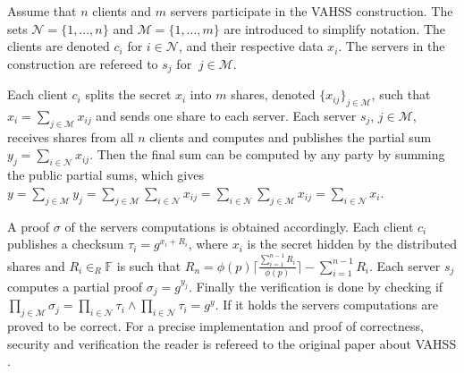 Assume that $n$ clients and $m$ servers participate in the VAHSS construction. The sets $\mathcal{N}=\{1,...,n\}$ and $\mathcal{M} = \{1,...,m\}$ are introduced to simplify notation. The clients are denoted $c_i$ for $i\in\mathcal{N}$, and their respective data $x_i$.  The servers in the construction are refereed to $s_j$ for $\:j\in\mathcal{M}$. 

Each client $c_i$ splits the secret $x_i$ into $m$ shares, denoted $\{x_{ij}\}_{j\in\mathcal{M}}$, such that $x_i=\sum_{j\in\mathcal{M}}x_{ij}$ and sends one share to each server. Each server $s_j$,  $j\in\mathcal{M}$, receives shares from all $n$ clients and computes and publishes the partial sum $y_j = \sum_{i\in\mathcal{N}} x_{ij} $. Then the final sum can be computed by any party by summing the public partial sums, which gives $y = \sum_{j\in\mathcal{M}} y_j = \sum_{j\in\mathcal{M}} \sum_{i\in\mathcal{N}} x_{ij} = \sum_{i\in\mathcal{N}} \sum_{j\in\mathcal{M}} x_{ij} =   \sum_{i\in\mathcal{N}}x_i$.


A proof $\sigma$ of the servers computations is obtained accordingly.  Each client $c_i$ publishes a checksum $\tau_i= g^{x_i+R_i}$, where $x_i$ is the secret hidden by the distributed shares and $R_i\in_R\mathds{F}$ is such that $R_n=\phi(p) \lceil \frac{\sum_{i=1}^{n-1}R_i}{\phi(p)}\rceil - \sum_{i=1}^{n-1}R_i $. Each server $s_j$ computes a partial proof $\sigma_j = g^{y_j}$.  Finally the verification is done by checking if $\prod_{j\in\mathcal{M}} \sigma_j = \prod_{i\in\mathcal{N}}\tau_i\wedge \prod_{i\in\mathcal{N}}\tau_i = g^y$.  If it holds the servers computations are proved to be correct. For a precise implementation and proof of correctness, security and verification the reader is refereed to the original paper about VAHSS \cite{SumItUp}.


